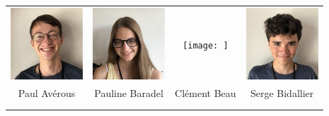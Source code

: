 

\vspace{2mm}
\begin{center}
\begin{tabular}{cccc}
\includegraphics[angle=270,origin=c, width=27mm]{eleves/Averous Paul.JPG} &
\includegraphics[angle=270,origin=c, width=27mm]{eleves/Baradel Pauline.JPG} &
\texttt{[image: ]} &
\includegraphics[angle=270,origin=c, width=27mm]{eleves/Bidallier Serge.JPG} \\
Paul Avérous & Pauline Baradel & Clément Beau & Serge Bidallier \\ \\ \\ 


\end{tabular}
\end{center}
